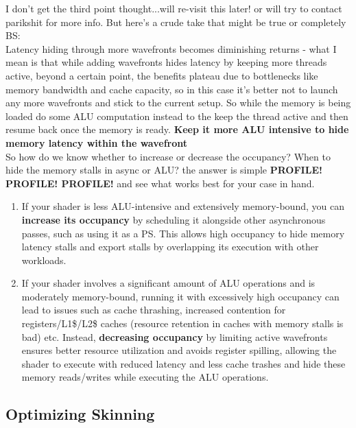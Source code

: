 \documentclass[14pt]{article}
\begin{document}
		I don't get the third point thought...will re-visit this later! or will try to contact parikshit for more info. But here's a crude take that might be true or completely BS: \\
		Latency hiding through more wavefronts becomes diminishing returns - what I mean is that while adding wavefronts hides latency by keeping more threads active, beyond a certain point, the benefits plateau due to bottlenecks like memory bandwidth and cache capacity, so in this case it's better not to launch any more wavefronts and stick to the current setup. So while the memory is being loaded do some ALU computation instead to the keep the thread active and then resume back once the memory is ready. \textbf{Keep it more ALU intensive to hide memory latency within the wavefront} \\
		
		So how do we know whether to increase or decrease the occupancy? When to hide the memory stalls in async or ALU? the answer is simple \textbf{PROFILE! PROFILE! PROFILE!} and see what works best for your case in hand.

	\begin{enumerate}
		\item If your shader is less ALU-intensive and extensively memory-bound, you can \textbf{increase its occupancy} by scheduling it alongside other asynchronous passes, such as using it as a PS. This allows high occupancy to hide memory latency stalls and export stalls by overlapping its execution with other workloads.
		
    		\item If your shader involves a significant amount of ALU operations and is moderately memory-bound, running it with excessively high occupancy can lead to issues such as cache thrashing, increased contention for registers/L1\$/L2\$ caches (resource retention in caches with memory stalls is bad) etc. Instead, \textbf{decreasing occupancy} by limiting active wavefronts ensures better resource utilization and avoids register spilling, allowing the shader to execute with reduced latency and less cache trashes and hide these memory reads/writes while executing the ALU operations.
	\end{enumerate}

\subsection*{Optimizing Skinning}
\end{document}

